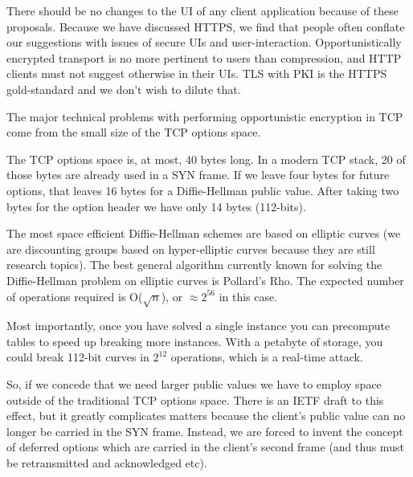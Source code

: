 \documentclass[conference]{IEEEtran}
\begin{document}
There should be no changes to the UI of any client application because of these
proposals. Because we have discussed HTTPS, we find that people often conflate
our suggestions with issues of secure UIs and user-interaction.
Opportunistically encrypted transport is no more pertinent to users than
compression, and HTTP clients must not suggest otherwise in their UIs.
TLS with PKI is the HTTPS gold-standard and we don't wish to dilute that.


The major technical problems with performing opportunistic encryption in TCP
come from the small size of the TCP options space.

The TCP options space is, at most, 40 bytes long. In a modern TCP stack, 20 of
those bytes are already used in a SYN frame. If we leave four bytes for future
options, that leaves 16 bytes for a Diffie-Hellman public value. After taking two
bytes for the option header we have only 14 bytes (112-bits).

The most space efficient Diffie-Hellman schemes are based on elliptic curves
(we are discounting groups based on hyper-elliptic curves\cite{edwards} because
they are still research topics). The best general algorithm currently known
for solving the Diffie-Hellman problem on elliptic curves is Pollard's Rho.
  The expected number of operations required is O($\sqrt{n}$), or $\approx 2^{56}$ in
this case.

Most importantly, once you have solved a single instance you can precompute
tables to speed up breaking more instances. With a petabyte of storage, you
could break 112-bit curves in $2^{12}$ operations, which is a real-time attack.

So, if we concede that we need larger public values we have to employ space
outside of the traditional TCP options space. There is an IETF draft to this
effect\cite{tcploo}, but it greatly complicates matters because the client's
public value can no longer be carried in the SYN frame. Instead, we are forced
to invent the concept of deferred options which are carried in the client's
second frame (and thus must be retransmitted and acknowledged etc).






\end{document}
